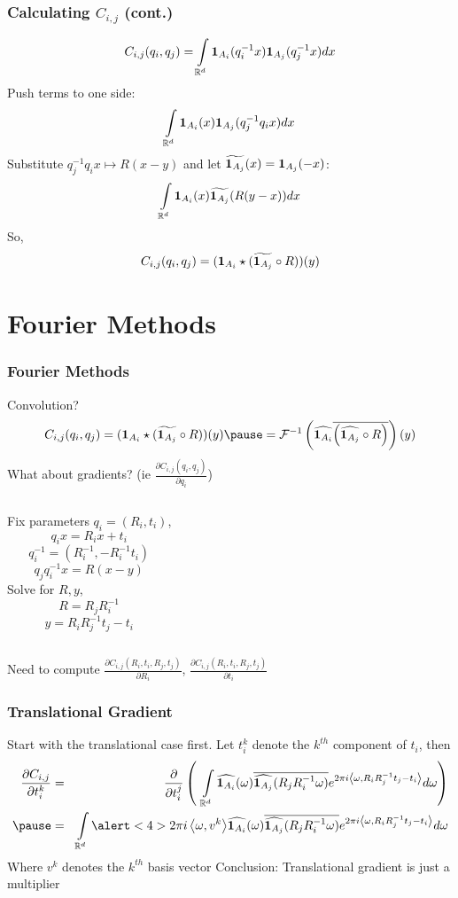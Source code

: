 \documentclass{beamer}
\begin{document}
\begin{frame}
\frametitle{Calculating $C_{i,j}$ (cont.)}
\[ C_{i,j}(q_i, q_j) = \int \limits_{\mathbb{R}^d} {\bf 1}_{A_i}(q_i^{-1} x) {\bf 1}_{A_j}(q_j^{-1} x) dx \]
\pause
Push terms to one side:
\[ \int \limits_{\mathbb{R}^d} {\bf 1}_{A_i}(x) {\bf 1}_{A_j}(q_j^{-1} q_i x) dx \]
\pause
Substitute $q_j^{-1} q_i x \mapsto R(x - y)$ and let $\widetilde{{\bf 1}_{A_j}}(x) = {\bf 1}_{A_j}(-x)$:
\[ \int \limits_{\mathbb{R}^d} {\bf 1}_{A_i}(x) \widetilde{{\bf 1}_{A_j}}(R(y - x)) dx \]
\pause
So,
\[ C_{i,j}(q_i, q_j) = ({\bf 1}_{A_i} \star (\widetilde{{\bf 1}_{A_j}} \circ R))(y) \]
\end{frame}

\section{Fourier Methods}
\begin{frame}
\frametitle{Fourier Methods}
Convolution? 
\[ C_{i,j}(q_i, q_j) = (\ind{A_i} \star (\widetilde{\ind{A_j}} \circ R))(y)
\pause
= \mathcal{F}^{-1} \left ( \widehat{\ind{A_i}} \overline{\left(\widehat{\ind{A_j}} \circ R \right)} \right )(y) \]
\pause
What about gradients? (ie $\frac{\partial C_{i,j}(q_i, q_j)}{\partial q_i}$)
\pause
\vskip5pt
\vskip5pt
\begin{columns}
		{\centering
		Fix parameters $q_i = (R_i, t_i)$, 
		\[q_i x = R_i x + t_i \]
		\[q_i^{-1} = (R_i^{-1}, -R_i^{-1} t_i) \]
		\[q_j q_i^{-1} x = R(x - y)\]
		}
		\pause
		{\centering
		Solve for $R, y$,
		\[ R = R_j R_i^{-1} \]
		\[ y = R_i R_j^{-1} t_j - t_i \]
		}
\end{columns}
\pause
Need to compute $\frac{\partial C_{i,j}(R_i, t_i, R_j, t_j)}{\partial R_i}$, $\frac{\partial C_{i,j}(R_i, t_i, R_j, t_j)}{\partial t_i}$
\end{frame}

\begin{frame}
\frametitle{Translational Gradient}
Start with the translational case first.
\vskip5pt
Let $t_i^k$ denote the $k^{th}$ component of $t_i$\pause, then
\begin{eqnarray*}
\frac{ \partial C_{i,j} }{ \partial t_i^k }
& = & \frac{ \partial }{ \partial t_i^j } \left( \:\: \int \limits_{\R^d} \widehat{\ind{A_i}}(\omega) \overline{\widehat{\ind{A_j}}(R_j R_i^{-1} \omega)} e^{2 \pi i \inner{\omega}{R_i R_j^{-1} t_j - t_i}} d \omega  \right ) \\
\pause & = & \int \limits_{\R^d} 
\alert<4>{2 \pi i \inner{\omega}{v^k}}
\widehat{\ind{A_i}}(\omega) \overline{\widehat{\ind{A_j}}(R_j R_i^{-1} \omega)} e^{2 \pi i \inner{\omega}{R_i R_j^{-1} t_j - t_i} } d \omega
\end{eqnarray*}
Where $v^k$ denotes the $k^{th}$ basis vector
\pause
\vskip5pt
Conclusion: Translational gradient is just a multiplier
\end{frame}
\end{document}
